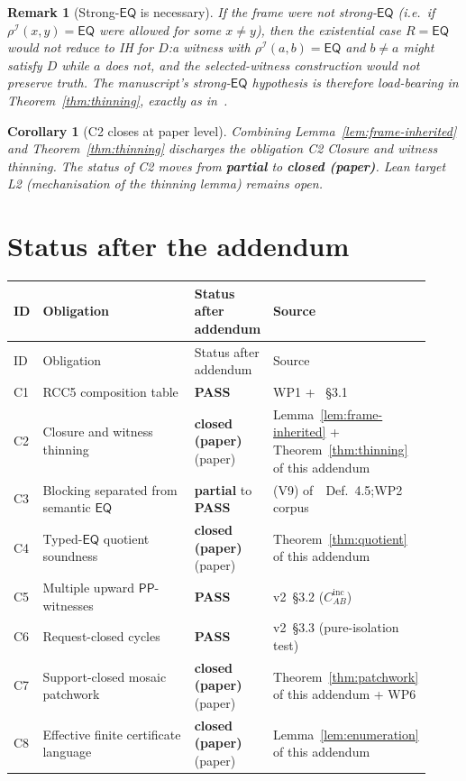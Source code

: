 \documentclass[11pt]{article}
\newtheorem{corollary}[theorem]{Corollary}
\newtheorem{remark}[theorem]{Remark}
\newcommand{\EQ}{\mathsf{EQ}}
\newcommand{\PP}{\mathsf{PP}}
\newcommand{\I}{\mathcal{I}}
\newcommand{\PASS}{\textcolor{black!70!green}{\textbf{PASS}}}
\newcommand{\PARTIAL}{\textcolor{black!60!orange}{\textbf{partial}}}
\newcommand{\CLOSED}{\textcolor{black!70!green}{\textbf{closed (paper)}}}
\begin{document}
\begin{remark}[Strong-\(\EQ\) is necessary]
If the frame were not strong-\(\EQ\) (i.e.\ if \(\rho^\I(x, y) = \EQ\)
were allowed for some \(x \ne y\)), then the existential case
\(R = \EQ\) would not reduce to IH for \(D\):\@ a witness with
\(\rho^\I(a, b) = \EQ\) and \(b \ne a\) might satisfy \(D\) while \(a\)
does not, and the selected-witness construction would not preserve
truth.  The manuscript's strong-\(\EQ\) hypothesis is therefore
load-bearing in Theorem~\ref{thm:thinning}, exactly as
in~\cite[\S3.2]{repaired}.
\end{remark}

\begin{corollary}[C2 closes at paper level]
Combining Lemma~\ref{lem:frame-inherited} and
Theorem~\ref{thm:thinning} discharges the obligation \emph{C2
Closure and witness thinning}.  The status of C2 moves from
\PARTIAL{} to \CLOSED{}.  Lean target L2 (mechanisation of the
thinning lemma) remains open.
\end{corollary}

\section{Status after the addendum}

\begin{center}\small
\renewcommand{\arraystretch}{1.25}
\begin{longtable}{p{0.06\linewidth} p{0.40\linewidth} p{0.16\linewidth} p{0.30\linewidth}}
\toprule
ID & Obligation & Status after addendum & Source \\
\midrule
\endfirsthead
\toprule
ID & Obligation & Status after addendum & Source \\
\midrule
\endhead
\bottomrule
\endfoot
C1 & RCC5 composition table & \PASS{} & WP1 + \cite{repaired}~\S3.1 \\
C2 & Closure and witness thinning & \CLOSED{} (paper)
   & Lemma~\ref{lem:frame-inherited} + Theorem~\ref{thm:thinning} of this addendum \\
C3 & Blocking separated from semantic \(\EQ\) & \PARTIAL{} to \PASS{}
   & (V9) of~\cite{repaired}~Def.~4.5;\@ WP2 corpus \\
C4 & Typed-\(\EQ\) quotient soundness & \CLOSED{} (paper)
   & Theorem~\ref{thm:quotient} of this addendum \\
C5 & Multiple upward \(\PP\)-witnesses & \PASS{}
   & v2~\S3.2 (\(C_{AB}^{\mathrm{inc}}\)) \\
C6 & Request-closed cycles & \PASS{}
   & v2~\S3.3 (pure-isolation test) \\
C7 & Support-closed mosaic patchwork & \CLOSED{} (paper)
   & Theorem~\ref{thm:patchwork} of this addendum + WP6 \\
C8 & Effective finite certificate language & \CLOSED{} (paper)
   & Lemma~\ref{lem:enumeration} of this addendum \\
\end{longtable}
\end{center}
\end{document}
